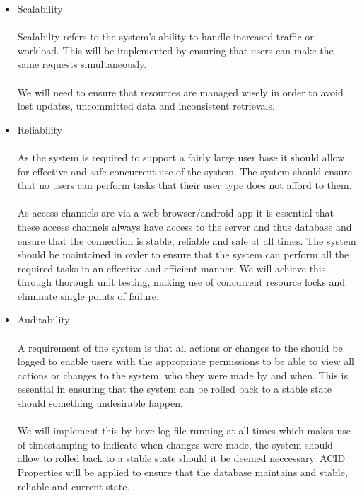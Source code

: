 \documentclass[a4paper]{article}
\begin{document}
\begin{itemize}
\begin{itemize}
    \item Scalability \\\\
        Scalabilty refers to the system's ability to handle increased traffic or workload. This will be implemented by ensuring that users can make the same requests simultaneously.
        \\\\
        We will need to ensure that resources are managed wisely in order to avoid lost updates, uncommitted data and inconsistent retrievals.

    \item Reliability \\\\
        As the system is required to support a fairly large user base it should allow for effective and safe concurrent use of the system. The system should ensure that no users can perform tasks that their user type does not afford to them.
        \\\\
        As access channels are via a web browser/android app it is essential that these access channels always have access to the server and thus database and ensure that the connection is stable, reliable and safe at all times. The system should be maintained in order  to ensure that the system can perform all the required tasks in an effective and efficient manner. We will achieve this through thorough unit testing, making use of concurrent resource locks and eliminate single points of failure.
    \item Auditability\\\\
        A requirement of the system is that all actions or changes to the should be logged to enable users with the appropriate permissions to be able to view all actions or changes to the system, who they were made by and when. This is essential in ensuring that the system can be rolled back to a stable state should something undesirable happen.
        \\\\
        We will implement this by have log file running at all times which makes use of timestamping to indicate when changes were made, the system should allow to rolled back to a stable state should it be deemed neccessary. ACID Properties will be applied to ensure that the database maintains and stable, reliable and current state.
        

\end{itemize}
\end{itemize}
\end{document}
